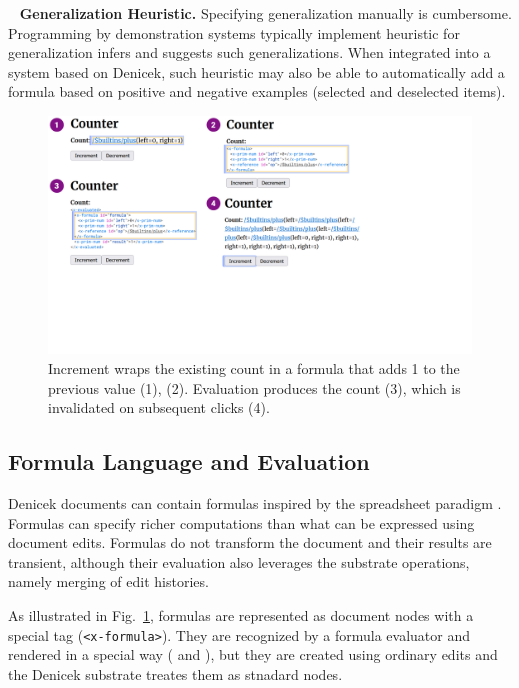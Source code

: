 \documentclass[sigconf,anonymous,screen]{acmart}
\newcommand*\circled[1]{\textnormal{\footnotesize\sffamily\bfseries\protect\tikz[baseline=(char.base)]{
  \node[shape=circle,fill=black,text=white,draw,inner sep=1pt] (char) {#1};}}}
\DeclareRobustCommand{\keyideabox}[3]{\begin{tcolorbox}[breakable,
  boxsep=5pt,left=0pt,right=0pt,top=0pt,bottom=0pt,width=\dimexpr\columnwidth\relax,
  colback=gray!20,colframe=gray!20,
  enlarge bottom by=0pt,enlarge top by=0pt,
  arc=0pt,outer arc=0pt]
\lettrine[lraise=0.3]{\LARGE #1}{~}
\small \textbf{#2.} #3
\end{tcolorbox}
}
\begin{document}
\keyideabox{\faMagic}{Generalization Heuristic}{Specifying generalization manually is cumbersome.
Programming by demonstration systems typically implement heuristic for generalization
\cite{myers-2000-intelligence} infers and suggests such generalizations. When integrated into
a system based on Denicek, such heuristic may also be able to automatically add a formula
based on positive and negative examples \cite{gulwani-2014-flash} (selected and deselected items).}

\begin{figure}[t]
\includegraphics[width=0.95\columnwidth,clip,trim=0cm 7cm 8cm 0cm]{fig/counter.pdf}
\caption{Increment wraps the existing count in a formula that adds 1 to the
previous value (1), (2). Evaluation produces the count (3), which is invalidated on subsequent clicks (4).}
\label{fig:counter}
\vspace{-1em}
\end{figure}

\subsection{Formula Language and Evaluation}
\label{sec:impl-eval}

Denicek documents can contain formulas inspired by the spreadsheet
paradigm \cite{nardi-1990-spreadsheets}. Formulas can specify richer computations than
what can be expressed using document edits. Formulas do not transform the document and their
results are transient, although their evaluation also leverages the substrate operations,
namely merging of edit histories.

As illustrated in Fig.~\ref{fig:counter}, formulas are represented as document nodes with a
special tag ({\small\Verb_<x-formula>_}). They are recognized by a formula evaluator and
rendered in a special way (\circled{1} and \circled{4}), but they are created using ordinary
edits and the Denicek substrate treates them as stnadard nodes.
\end{document}
